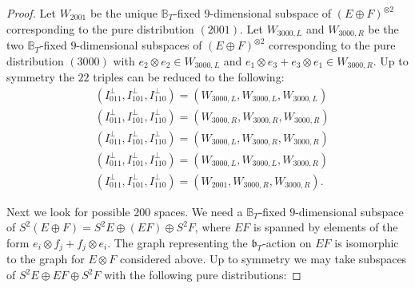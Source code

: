 \documentclass[12pt]{amsart}
\theoremstyle{definition}
\theoremstyle{remark}
\theoremstyle{definition}
\begin{document}
\begin{proof}
    Let $W_{2001}$ be the unique $\mathbb{B}_T$-fixed $9$-dimensional subspace of $(E\oplus F)^{\otimes 2}$ corresponding to the pure distribution $(2001)$.
    Let $W_{3000,L}$ and $W_{3000,R}$ be the two $\mathbb{B}_T$-fixed $9$-dimensional subspaces of $(E\oplus F)^{\otimes 2}$ corresponding to the pure distribution $(3000)$ with $e_2\otimes e_2 \in W_{3000,L}$ and $e_1\otimes e_3 + e_3\otimes e_1 \in W_{3000,R}$. Up to symmetry the $22$ triples can be reduced to the following:
    \begin{align*}
    &(I_{011}^\perp, I_{101}^\perp, I_{110}^\perp) = (W_{3000,L}, W_{3000,L},  W_{3000,L})\\
    &(I_{011}^\perp, I_{101}^\perp, I_{110}^\perp) = (W_{3000,R}, W_{3000,R}, W_{3000,R}) \\
    &(I_{011}^\perp, I_{101}^\perp, I_{110}^\perp) = (W_{3000,L}, W_{3000,R}, W_{3000,R}) \\
    &(I_{011}^\perp, I_{101}^\perp, I_{110}^\perp) = (W_{3000,L}, W_{3000,L}, W_{3000, R}) \\
    &(I_{011}^\perp, I_{101}^\perp, I_{110}^\perp) = (W_{2001}, W_{3000,R}, W_{3000,R} ).
    \end{align*}
    


    
    Next we look for possible $200$ spaces. We need a $\mathbb{B}_T$-fixed $9$-dimensional subspace of $S^2(E\oplus F) = S^2 E \oplus (EF) \oplus S^2F$, where $EF$ is spanned by elements of the form $e_i\otimes f_j + f_j\otimes e_i$. The graph representing the $\mathfrak{b}_T$-action on $EF$ is isomorphic to the graph for $E\otimes F$ considered above. Up to symmetry we may take subspaces of $S^2E \oplus EF \oplus  S^2 F$ with the following pure distributions:
     

\end{proof}
\end{document}
